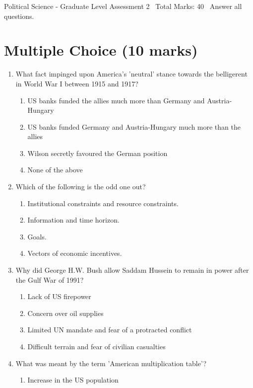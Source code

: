 \documentclass[12pt]{article}
\begin{document}
\begin{center}
Political Science - Graduate Level Assessment 2 \
Total Marks: 40 \
Answer all questions.
\end{center}

\section*{Multiple Choice (10 marks)}
\begin{enumerate}[label=\arabic*.]
\item What fact impinged upon America's 'neutral' stance towards the belligerent in World War I between 1915 and 1917?
\begin{enumerate}[label=(\alph*)]
    \item US banks funded the allies much more than Germany and Austria-Hungary
    \item US banks funded Germany and Austria-Hungary much more than the allies
    \item Wilson secretly favoured the German position
    \item None of the above
\end{enumerate}
\item Which of the following is the odd one out?
\begin{enumerate}[label=(\alph*)]
    \item Institutional constraints and resource constraints.
    \item Information and time horizon.
    \item Goals.
    \item Vectors of economic incentives.
\end{enumerate}
\item Why did George H.W. Bush allow Saddam Hussein to remain in power after the Gulf War of 1991?
\begin{enumerate}[label=(\alph*)]
    \item Lack of US firepower
    \item Concern over oil supplies
    \item Limited UN mandate and fear of a protracted conflict
    \item Difficult terrain and fear of civilian casualties
\end{enumerate}
\item What was meant by the term 'American multiplication table'?
\begin{enumerate}[label=(\alph*)]
    \item Increase in the US population

\end{enumerate}
\end{enumerate}
\end{document}

